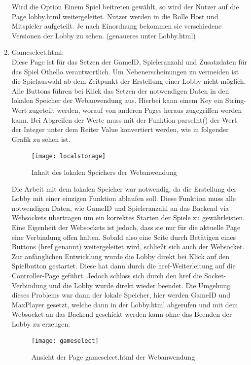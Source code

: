\documentclass[12pt,a4paper]{article}
\begin{document}
\begin{enumerate}
Wird die Option \glqq Einem Spiel beitreten\grqq{} gewählt, so wird der Nutzer auf die Page \glqq lobby.html\grqq{} weitergeleitet. Nutzer werden in die Rolle Host und Mitspieler aufgeteilt. Je nach Einordnung bekommen sie verschiedene Versionen der Lobby zu sehen. (genaueres unter Lobby.html)

\item{Gameselect.html:}\\
Diese Page ist für das Setzen der GameID, Spieleranzahl und Zusatzdaten für das Spiel \glqq Othello\grqq{} verantwortlich. Um Nebenerscheinungen zu vermeiden ist die Spielauswahl ab dem Zeitpunkt der Erstellung einer Lobby nicht möglich. Alle Buttons führen bei Klick das Setzen der notwendigen Daten in den lokalen Speicher der Webanwendung aus. Hierbei kann einem Key ein String-Wert zugeteilt werden, worauf von anderen Pages heraus zugegriffen werden kann. Bei Abgreifen der Werte muss mit der Funktion \glqq parseInt()\grqq{} der Wert der Integer unter dem Reiter Value konvertiert werden, wie in folgender Grafik zu sehen ist. 
	
	\begin{figure}[h]
	\centering
	\texttt{[image: localstorage]}
	\caption{\label{fig:local}Inhalt des lokalen Speichers der Webanwendung}
	\end{figure}

Die Arbeit mit dem lokalen Speicher war notwendig, da die Erstellung der Lobby mit einer einzigen Funktion ablaufen soll. Diese Funktion muss alle notwendigen Daten, wie GameID und Spieleranzahl an das Backend via Websockets übertragen um ein korrektes Starten der Spiele zu gewährleisten. Eine Eigenheit der Websockets ist jedoch, dass sie nur für die aktuelle Page eine Verbindung offen halten. Sobald also eine Seite durch Betätigen eines Buttons (\glqq href\grqq{} genannt) weitergeleitet wird, schließt sich auch der Websocket.
\vspace{1.5ex}\\
Zur anfänglichen Entwicklung wurde die Lobby direkt bei Klick auf den Spielbutton gestartet. Diese hat dann durch die href-Weiterleitung auf die Controller-Page geführt. Jedoch schloss sich durch den href die Socket-Verbindung und die Lobby wurde direkt wieder beendet. Die Umgehung dieses Problems war dann der lokale Speicher, hier werden GameID und MaxPlayer gesetzt, welche dann in der Lobby.html abgerufen und mit dem Websocket an das Backend geschickt werden kann ohne das Beenden der Lobby zu erzeugen. 

	\begin{figure}[h]
	\centering
	\texttt{[image: gameselect]}
	\caption{\label{fig:select}Ansicht der Page \glqq gameselect.html\grqq{} der Webanwendung}
	\end{figure}


\end{enumerate}
\end{document}
